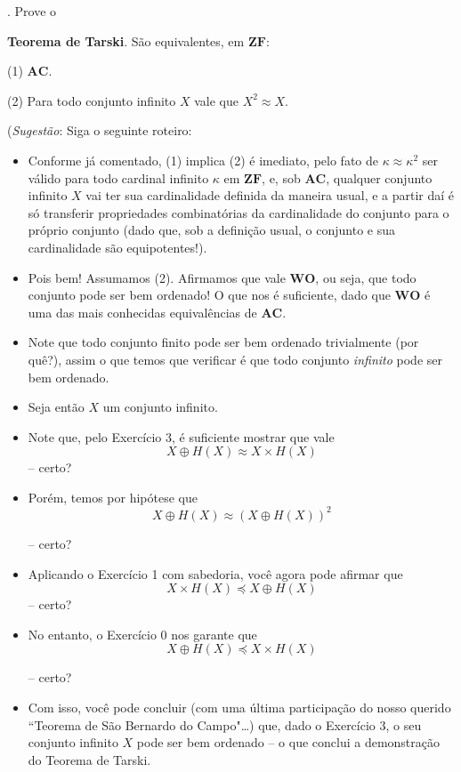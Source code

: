 \documentclass{hipatia}
\newcommand{\n}{\noindent}
\newcommand{\equip}{\approx}
\newcommand{\wo}{\mathbf{WO}}
\newcommand{\ac}{\mathbf{AC}}
\newcommand{\zf}{\mathbf{ZF}}
\newcommand{\dominado}{\preccurlyeq}
\newcommand{\unidis}{\oplus}
\begin{document}
\n {\bf Exercício 4}. Prove o

{\bf Teorema de Tarski}. São equivalentes, em
$\zf$:

(1) $\ac$.

(2) Para todo conjunto infinito $X$ vale que
$X^2 \equip X$.

({\it Sugestão}: Siga o seguinte roteiro:

\begin{itemize}

\item Conforme já comentado, (1) implica (2)
é imediato, pelo fato de $\kappa \equip
\kappa^2$ ser válido para todo cardinal
infinito $\kappa$ em $\zf$, e, sob $\ac$,
qualquer conjunto infinito $X$ vai ter sua
cardinalidade definida da maneira usual, e
a partir daí é só transferir propriedades
combinatórias da cardinalidade do conjunto
para o próprio conjunto (dado que, sob a
definição usual, o conjunto e sua
cardinalidade são equipotentes!). 


\item Pois bem! Assumamos (2). Afirmamos que
vale $\wo$, ou seja, que todo conjunto
pode ser bem ordenado! O que nos é
suficiente, dado que $\wo$ é uma das mais
conhecidas equivalências de $\ac$. 

\item Note que todo conjunto finito pode ser
bem ordenado trivialmente (por quê?),
assim o que temos que verificar é que todo
conjunto {\it infinito} pode ser bem
ordenado. 

\item Seja então $X$ um conjunto infinito. 

\item Note que, pelo Exercício 3, é
suficiente mostrar que vale $$X \oplus
H(X) \equip X \times H(X)$$ -- certo?

\item Porém, temos por hipótese que $$X
\unidis H(X) \equip (X \unidis H(X))^2$$

-- certo?

\item Aplicando o Exercício 1 com sabedoria,
você agora pode afirmar que  $$X \times
H(X) \dominado X \oplus H(X)$$    --
certo?

\item No entanto, o Exercício 0 nos garante
que $$X \oplus H(X) \dominado X \times
H(X)$$

-- certo?

\item Com isso, você pode concluir (com uma
última participação do nosso querido
``Teorema de São Bernardo do Campo"\ldots)
que, dado o Exercício 3, o seu conjunto
infinito $X$ pode ser bem ordenado -- o
que conclui a demonstração do Teorema de
Tarski. 



\end{itemize}
\end{document}
